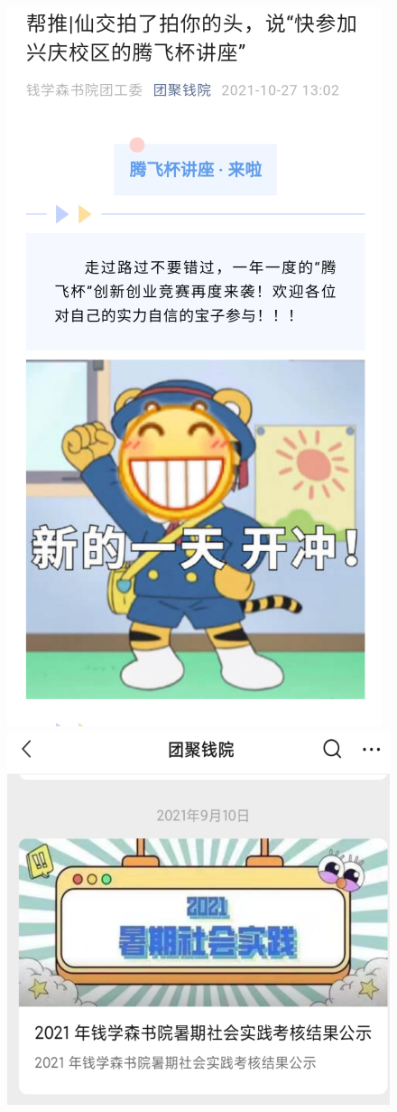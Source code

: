 \documentclass[
decoration,  %
]{qyxf-book}
\begin{document}
\begin{figure}[H]
\begin{minipage}{5cm}
        		\includegraphics[]{pics/shsj2.png}
        		\end{minipage}
				\begin{minipage}{5cm}
				\includegraphics[scale=0.8]{pics/shsj3.png}

\end{minipage}
\end{figure}
\end{document}
